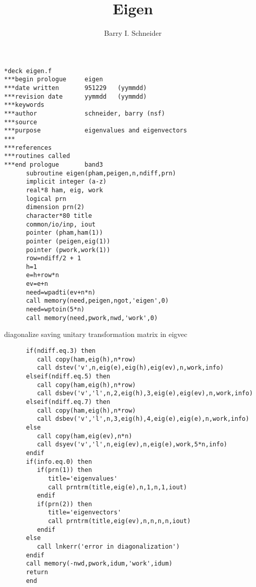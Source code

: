 \documentclass{article}
\title{Eigen}
\author{Barry I. Schneider}
\date{}
\begin{document}
 \maketitle
\begin{verbatim}
*deck eigen.f
***begin prologue     eigen
***date written       951229   (yymmdd)
***revision date      yymmdd   (yymmdd)
***keywords           
***author             schneider, barry (nsf)
***source             
***purpose            eigenvalues and eigenvectors
***                   
***references         
***routines called    
***end prologue       band3
      subroutine eigen(pham,peigen,n,ndiff,prn)
      implicit integer (a-z)
      real*8 ham, eig, work
      logical prn
      dimension prn(2)
      character*80 title
      common/io/inp, iout
      pointer (pham,ham(1))
      pointer (peigen,eig(1))
      pointer (pwork,work(1))
      row=ndiff/2 + 1
      h=1
      e=h+row*n
      ev=e+n
      need=wpadti(ev+n*n)
      call memory(need,peigen,ngot,'eigen',0)
      need=wptoin(5*n)
      call memory(need,pwork,nwd,'work',0)
\end{verbatim}
     diagonalize saving unitary transformation matrix in eigvec
\begin{verbatim}
      if(ndiff.eq.3) then
         call copy(ham,eig(h),n*row)
         call dstev('v',n,eig(e),eig(h),eig(ev),n,work,info)
      elseif(ndiff.eq.5) then
         call copy(ham,eig(h),n*row)
         call dsbev('v','l',n,2,eig(h),3,eig(e),eig(ev),n,work,info)
      elseif(ndiff.eq.7) then
         call copy(ham,eig(h),n*row)
         call dsbev('v','l',n,3,eig(h),4,eig(e),eig(e),n,work,info)
      else
         call copy(ham,eig(ev),n*n)
         call dsyev('v','l',n,eig(ev),n,eig(e),work,5*n,info)
      endif
      if(info.eq.0) then
         if(prn(1)) then
            title='eigenvalues'
            call prntrm(title,eig(e),n,1,n,1,iout)
         endif 
         if(prn(2)) then
            title='eigenvectors'
            call prntrm(title,eig(ev),n,n,n,n,iout)
         endif
      else
         call lnkerr('error in diagonalization')
      endif 
      call memory(-nwd,pwork,idum,'work',idum)
      return
      end       
\end{verbatim}
\end{document}
